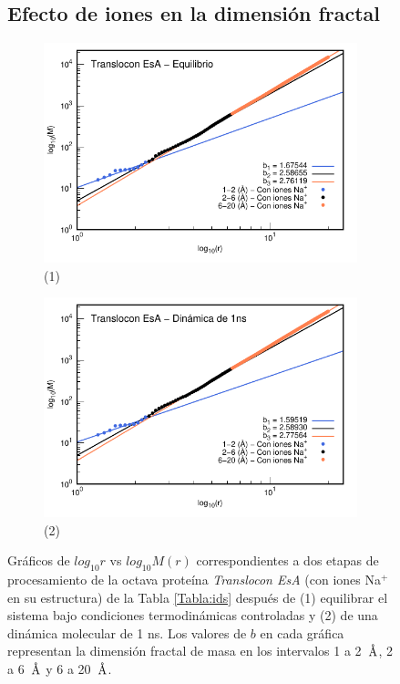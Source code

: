 	
	
	
	\begin{figure}[H]
		\subsection*{Efecto de iones en la dimensi\'{o}n fractal}	
		\centering
		\begin{subfigure}{0.49\textwidth}
			\centering
			\includegraphics[width=\linewidth,page=1]{graphs/PDBs/7khw/ions/7khwEq-wions.pdf}
			\caption{(1)}
		\end{subfigure}
		\hfill
		\begin{subfigure}{0.49\textwidth}
			\centering
			\includegraphics[width=\linewidth,page=1]{graphs/PDBs/7khw/ions/7khw1ns-wions.pdf}
			\caption{(2)}
		\end{subfigure}
		\caption{Gr\'{a}ficos de $log_{10}r$ vs $log_{10}M(r)$ correspondientes a dos etapas de procesamiento de la octava prote\'{i}na \textit{Translocon EsA} (con iones Na$^{+}$ en su estructura) de la Tabla \ref{Tabla:ids} despu\'{e}s de (1) equilibrar el sistema bajo condiciones termodin\'{a}micas controladas y (2) de una din\'{a}mica molecular de 1 ns. Los valores de $b$ en cada gr\'{a}fica representan la dimensi\'{o}n fractal de masa en los intervalos 1 a 2~$\textup{\r{A}}$, 2 a 6~$\textup{\r{A}}$ y 6 a 20~$\textup{\r{A}}$.}
		\label{fig:7khw-wions}
	\end{figure}
	
